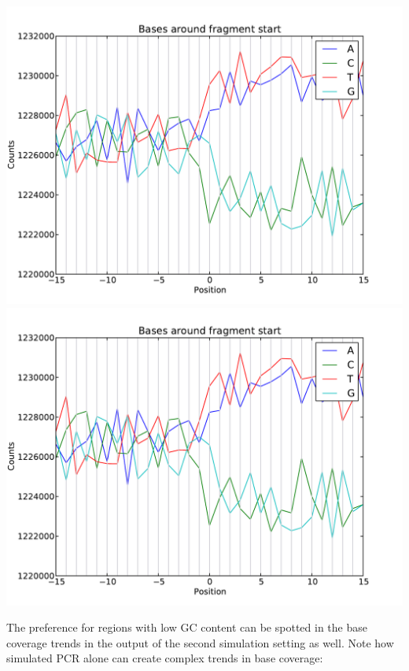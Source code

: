 \begin{center}
\includegraphics[scale=0.6,page=1]{../src/test/pos_bias/pb_pcr.pdf}
\\
\includegraphics[scale=0.6,page=2]{../src/test/pos_bias/pb_pcr.pdf}
\end{center}

The preference for regions with low GC content can be spotted in the base coverage trends in the output of the second simulation setting as well.
Note how simulated PCR alone can create complex trends in base coverage:


